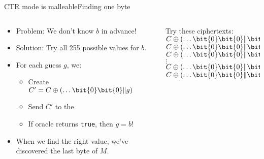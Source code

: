 \documentclass[aspectratio=169, lualatex, handout]{beamer}
\begin{document}
\begin{frame}{CTR mode is malleable}{Finding one byte}
	\begin{columns}[c]
		\begin{column}{0.5\textwidth}
			\begin{itemize}[<+->]
				\item Problem: We don't know $b$ in advance!
				\item Solution: Try all 255 possible values for $b$.
				\item For each guess $g$, we:
				      \begin{itemize}
					      \item Create $C' = C \oplus (\ldots \bit{0}\bit{0} \| g)$
					      \item Send $C'$ to the 
					      \item If oracle returns \texttt{true}, then $g = b$!
				      \end{itemize}
				\item When we find the right value, we've discovered the last byte of $M$.
			\end{itemize}
		\end{column}
		\begin{column}{0.5\textwidth}
			\begin{center}
				Try these ciphertexts:\\
				$C \oplus (\ldots \bit{0}\bit{0} \| \bit{0}\bit{1})$\\
				$C \oplus (\ldots \bit{0}\bit{0} \| \bit{0}\bit{2})$\\
				$C \oplus (\ldots \bit{0}\bit{0} \| \bit{0}\bit{3})$\\
				$\vdots$\\
				$C \oplus (\ldots \bit{0}\bit{0} \| \bit{f}\bit{e})$\\
				$C \oplus (\ldots \bit{0}\bit{0} \| \bit{f}\bit{f})$
			\end{center}
		\end{column}
	\end{columns}
\end{frame}
\end{document}
